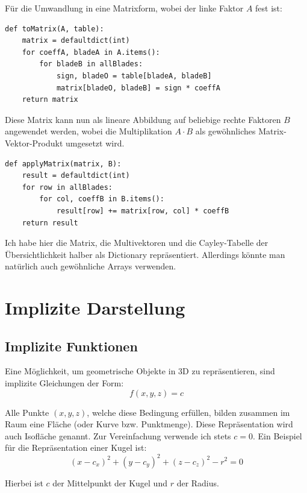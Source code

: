 \documentclass[
	ngerman,%
	accentcolor=9c,%
	ruledheaders=section,%
	class=report,%
	thesis={type=bachelor},%
	fontsize=11pt,%
	parskip=half-,%
	custommargins=true,%
	marginpar=false,%
]{tudapub}
\begin{document}
Für die Umwandlung in eine Matrixform, wobei der linke Faktor \( A \) fest ist:

\begin{verbatim}
def toMatrix(A, table):
    matrix = defaultdict(int)
    for coeffA, bladeA in A.items():
        for bladeB in allBlades:
            sign, bladeO = table[bladeA, bladeB]
            matrix[bladeO, bladeB] = sign * coeffA
    return matrix
\end{verbatim}

Diese Matrix kann nun als lineare Abbildung auf beliebige rechte Faktoren \( B \) angewendet werden, wobei die Multiplikation \( A \cdot B \) als gewöhnliches Matrix-Vektor-Produkt umgesetzt wird.

\begin{verbatim}
def applyMatrix(matrix, B):
    result = defaultdict(int)
    for row in allBlades:
        for col, coeffB in B.items():
            result[row] += matrix[row, col] * coeffB
    return result
\end{verbatim}

Ich habe hier die Matrix, die Multivektoren und die Cayley-Tabelle der Übersichtlichkeit halber als Dictionary repräsentiert. Allerdings könnte man natürlich auch gewöhnliche Arrays verwenden.


\section{Implizite Darstellung}
\subsection{Implizite Funktionen}
Eine Möglichkeit, um geometrische Objekte in 3D zu repräsentieren, sind implizite
Gleichungen der Form:
\[
f(x, y, z) = c
\]

Alle Punkte $(x, y, z)$, welche diese Bedingung erfüllen, bilden zusammen im Raum eine Fläche
(oder Kurve bzw. Punktmenge). Diese Repräsentation wird auch Isofläche genannt. Zur
Vereinfachung verwende ich stets $c = 0$. Ein Beispiel für die Repräsentation einer Kugel ist:
\[
(x - c_x)^2 + (y - c_y)^2 + (z - c_z)^2 - r^2 = 0
\]

Hierbei ist $c$ der Mittelpunkt der Kugel und $r$ der Radius.
\end{document}
